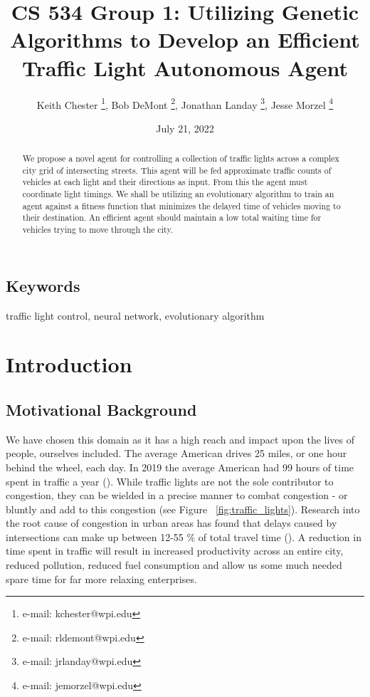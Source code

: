 \documentclass[twocolumn]{article}
\begin{document}
\title{CS 534 Group 1: Utilizing Genetic Algorithms to Develop an Efficient Traffic Light Autonomous Agent}
\author{Keith Chester \thanks{e-mail: kchester@wpi.edu}, Bob DeMont \thanks{e-mail: rldemont@wpi.edu}, Jonathan Landay \thanks{e-mail: jrlanday@wpi.edu}, Jesse Morzel \thanks{e-mail: jemorzel@wpi.edu}}
\date{July 21, 2022}   %

\maketitle

\begin{abstract}

We propose a novel agent for controlling a collection of traffic lights across a complex city grid of intersecting streets. This agent will be fed approximate traffic counts of vehicles at each light and their directions as input. From this the agent must coordinate light timings. We shall be utilizing an evolutionary algorithm to train an agent against a fitness function that minimizes the delayed time of vehicles moving to their destination. An efficient agent should maintain a low total waiting time for vehicles trying to move through the city.

\end{abstract}

\subsection*{Keywords}
traffic light control, neural network, evolutionary algorithm


\section{Introduction}

\subsection{Motivational Background}

We have chosen this domain as it has a high reach and impact upon the lives of people, ourselves included. The average American drives 25 miles, or one hour behind the wheel, each day. In 2019 the average American had 99 hours of time spent in traffic a year (\cite{INRIX}). While traffic lights are not the sole contributor to congestion, they can be wielded in a precise manner to combat congestion - or bluntly and add to this congestion (see Figure ~\ref{fig:traffic_lights}). Research into the root cause of congestion in urban areas has found that delays caused by intersections can make up between 12-55 \% of total travel time (\cite{Jones}). A reduction in time spent in traffic will result in increased productivity across an entire city, reduced pollution, reduced fuel consumption and allow us some much needed spare time for far more relaxing enterprises.
\end{document}
